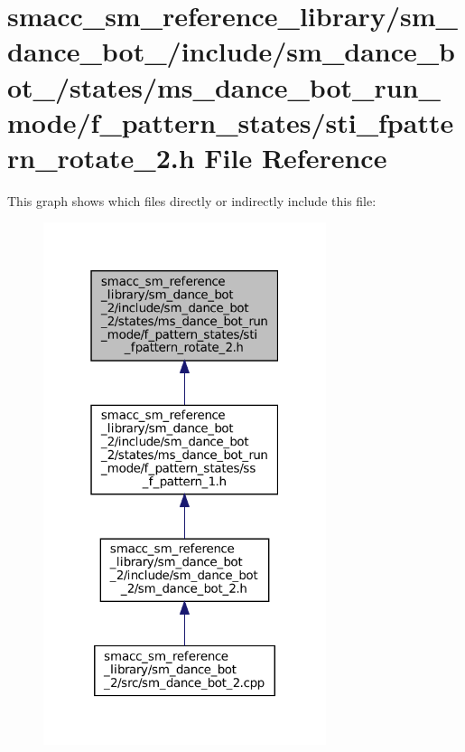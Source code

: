 \hypertarget{sm__dance__bot__2_2include_2sm__dance__bot__2_2states_2ms__dance__bot__run__mode_2f__pattern__st64b323fd213388aabb99698b2da8a04a}{}\section{smacc\+\_\+sm\+\_\+reference\+\_\+library/sm\+\_\+dance\+\_\+bot\+\_/include/sm\+\_\+dance\+\_\+bot\+\_/states/ms\+\_\+dance\+\_\+bot\+\_\+run\+\_\+mode/f\+\_\+pattern\+\_\+states/sti\+\_\+fpattern\+\_\+rotate\+\_\+2.h File Reference}
\label{sm__dance__bot__2_2include_2sm__dance__bot__2_2states_2ms__dance__bot__run__mode_2f__pattern__st64b323fd213388aabb99698b2da8a04a}
This graph shows which files directly or indirectly include this file\+:
\nopagebreak
\begin{figure}[H]
\begin{center}
\leavevmode
\includegraphics[width=235pt]{sm__dance__bot__2_2include_2sm__dance__bot__2_2states_2ms__dance__bot__run__mode_2f__pattern__stf43df6ee69e11cb60fae1e15edccc324}
\end{center}
\end{figure}
